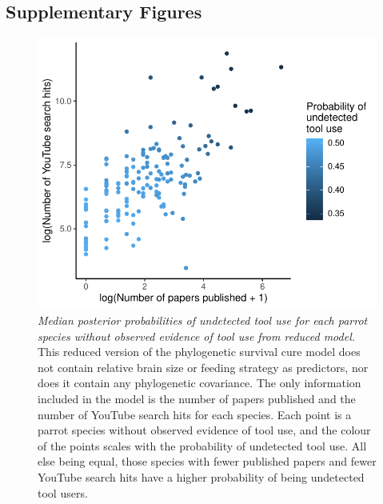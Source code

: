 \documentclass[
  man, donotrepeattitle,floatsintext]{apa6}
\begin{document}
\hypertarget{supplementary-figures}{%
\subsection{Supplementary Figures}\label{supplementary-figures}}



\begin{figure}
\centering
\includegraphics{manuscript_files/figure-latex/plotSurvCure3-1.pdf}
\caption{\label{fig:plotSurvCure3}\emph{Median posterior probabilities of undetected tool use for each parrot species without observed evidence of tool use from reduced model.} This reduced version of the phylogenetic survival cure model does not contain relative brain size or feeding strategy as predictors, nor does it contain any phylogenetic covariance. The only information included in the model is the number of papers published and the number of YouTube search hits for each species. Each point is a parrot species without observed evidence of tool use, and the colour of the points scales with the probability of undetected tool use. All else being equal, those species with fewer published papers and fewer YouTube search hits have a higher probability of being undetected tool users.}
\end{figure}

\newpage
\end{document}
